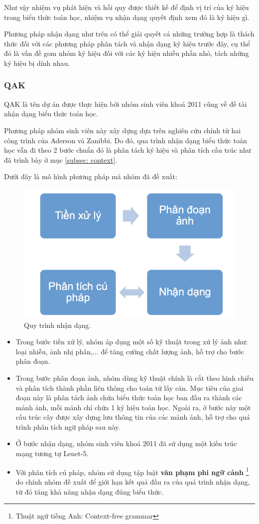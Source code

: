\documentclass[a4paper,12pt]{article}
\begin{document}
	Như vậy nhiệm vụ phát hiện và hồi quy được thiết kế để định vị trí của ký hiệu trong biểu thức toán học, nhiệm vụ nhận dạng quyết định xem đó là ký hiệu gì.
	
	Phương pháp nhận dạng như trên có thể giải quyết cả những trường hợp là thách thức đối với các phương pháp phân tách và nhận dạng ký hiệu trước đây, cụ thể đó là vấn đề gom nhóm ký hiệu đối với các ký hiệu nhiều phần nhỏ, tách những ký hiệu bị dính nhau.
	
	\subsubsection{QAK\cite{qak}}
	QAK là tên dự án được thực hiện bởi nhóm sinh viên khoá 2011 cũng về đề tài nhận dạng biểu thức toán học.
	
	Phương pháp nhóm sinh viên này xây dựng dựa trên nghiên cứu chính từ hai công trình của Aderson\cite{anderson} và Zanibbi\cite{zanibbi}. Do đó, qua trình nhận dạng biểu thức toán học vẫn đi theo 2 bước chuẩn đó là phân tách ký hiệu và phân tích cấu trúc như đã trình bày ở mục \ref{subsec: context}. 
	
	Dưới đây là mô hình phương pháp mà nhóm đã đề xuất:
	
	\begin{figure}[!h]
		\centering
		\includegraphics[width=0.5\linewidth]{2011.png}
		\vspace{1cm}
		\caption{Quy trình nhận dạng.}
		
	\end{figure}
	
	\begin{itemize}
		\item Trong bước tiền xử lý, nhóm áp dụng một số kỹ thuật trong xử lý ảnh như: loại nhiễu, ảnh nhị phân,... để tăng cường chất lượng ảnh, hỗ trợ cho bước phân đoạn.
		\item Trong bước phân đoạn ảnh, nhóm dùng kỹ thuật chính là cắt theo hình chiếu\cite{segment} và phân tích thành phần liên thông\cite{segment} cho toán tử lấy căn. Mục tiêu của giai đoạn này là phân tách ảnh chứa biểu thức toán học ban đầu ra thành các mảnh ảnh, mỗi mảnh chỉ chứa 1 ký hiệu toán học. Ngoài ra, ở bước này một cấu trúc cây được xây dựng lưu thông tin của các mảnh ảnh, hỗ trợ cho quá trình phân tích ngữ pháp sau này.
		\item Ở bước nhận dạng, nhóm sinh viên khoá 2011 đã sử dụng một kiến trúc mạng tương tự Lenet-5\cite{yanlecun}.
		\item Với phân tích cú pháp, nhóm sử dụng tập luật \textbf{văn phạm phi ngữ cảnh} \footnote{Thuật ngữ tiếng Anh: Context-free grammar} do chính nhóm đề xuất để giới hạn kết quả đầu ra của quá trình nhận dạng, từ đó tăng khả năng nhận dạng đúng biểu thức. 
	\end{itemize}
	
\end{document}
